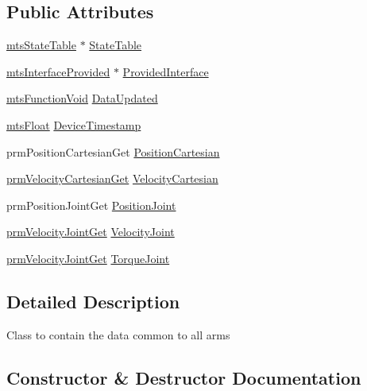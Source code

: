 \subsection*{Public Attributes}
\begin{DoxyCompactItemize}
\item 
\hyperlink{classmts_state_table}{mts\+State\+Table} $\ast$ \hyperlink{classmts_intuitive_da_vinci_1_1_arm_data_a46b59a678c5baaab10da5e4c7aaabe5e}{State\+Table}
\item 
\hyperlink{classmts_interface_provided}{mts\+Interface\+Provided} $\ast$ \hyperlink{classmts_intuitive_da_vinci_1_1_arm_data_a2e35a1f532d9d90100d6f58bad1ef7a0}{Provided\+Interface}
\item 
\hyperlink{classmts_function_void}{mts\+Function\+Void} \hyperlink{classmts_intuitive_da_vinci_1_1_arm_data_af71c6ee7db607fff0167e66926d6efea}{Data\+Updated}
\item 
\hyperlink{mts_generic_object_proxy_8h_a8750bcf116b87de6dedd90515e57eb6f}{mts\+Float} \hyperlink{classmts_intuitive_da_vinci_1_1_arm_data_a6318dd3fb2743ef06e676ea5e4e7a556}{Device\+Timestamp}
\item 
prm\+Position\+Cartesian\+Get \hyperlink{classmts_intuitive_da_vinci_1_1_arm_data_aa34441eee09790912bcee659dc805314}{Position\+Cartesian}
\item 
\hyperlink{classprm_velocity_cartesian_get}{prm\+Velocity\+Cartesian\+Get} \hyperlink{classmts_intuitive_da_vinci_1_1_arm_data_aa26ed3e13aeab62e1fdae9bd75ee170f}{Velocity\+Cartesian}
\item 
prm\+Position\+Joint\+Get \hyperlink{classmts_intuitive_da_vinci_1_1_arm_data_aa29266131113a857b0c972f804318dbd}{Position\+Joint}
\item 
\hyperlink{classprm_velocity_joint_get}{prm\+Velocity\+Joint\+Get} \hyperlink{classmts_intuitive_da_vinci_1_1_arm_data_a664aeae6730eb511571774698f962def}{Velocity\+Joint}
\item 
\hyperlink{classprm_velocity_joint_get}{prm\+Velocity\+Joint\+Get} \hyperlink{classmts_intuitive_da_vinci_1_1_arm_data_a2575a91719913cc0d8ce506c636fc9fa}{Torque\+Joint}
\end{DoxyCompactItemize}


\subsection{Detailed Description}
Class to contain the data common to all arms 

\subsection{Constructor \& Destructor Documentation}
\hypertarget{classmts_intuitive_da_vinci_1_1_arm_data_a508861edc4d669d0b51459a9159e6f94}{}
